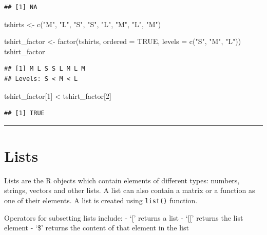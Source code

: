 \documentclass[
]{book}
\newenvironment{Shaded}{\begin{snugshade}}{\end{snugshade}}
\newcommand{\AttributeTok}[1]{\textcolor[rgb]{0.77,0.63,0.00}{#1}}
\newcommand{\ConstantTok}[1]{\textcolor[rgb]{0.00,0.00,0.00}{#1}}
\newcommand{\DecValTok}[1]{\textcolor[rgb]{0.00,0.00,0.81}{#1}}
\newcommand{\FunctionTok}[1]{\textcolor[rgb]{0.00,0.00,0.00}{#1}}
\newcommand{\NormalTok}[1]{#1}
\newcommand{\OtherTok}[1]{\textcolor[rgb]{0.56,0.35,0.01}{#1}}
\newcommand{\SpecialCharTok}[1]{\textcolor[rgb]{0.00,0.00,0.00}{#1}}
\newcommand{\StringTok}[1]{\textcolor[rgb]{0.31,0.60,0.02}{#1}}
\begin{document}
\begin{verbatim}
## [1] NA
\end{verbatim}

\begin{Shaded}
\begin{Highlighting}[]
\NormalTok{tshirts }\OtherTok{\textless{}{-}} \FunctionTok{c}\NormalTok{(}\StringTok{"M"}\NormalTok{, }\StringTok{"L"}\NormalTok{, }\StringTok{"S"}\NormalTok{, }\StringTok{"S"}\NormalTok{, }\StringTok{"L"}\NormalTok{, }\StringTok{"M"}\NormalTok{, }\StringTok{"L"}\NormalTok{, }\StringTok{"M"}\NormalTok{)}

\NormalTok{tshirt\_factor }\OtherTok{\textless{}{-}} \FunctionTok{factor}\NormalTok{(tshirts, }\AttributeTok{ordered =} \ConstantTok{TRUE}\NormalTok{,}
                        \AttributeTok{levels =} \FunctionTok{c}\NormalTok{(}\StringTok{"S"}\NormalTok{, }\StringTok{"M"}\NormalTok{, }\StringTok{"L"}\NormalTok{))}
\NormalTok{tshirt\_factor}
\end{Highlighting}
\end{Shaded}

\begin{verbatim}
## [1] M L S S L M L M
## Levels: S < M < L
\end{verbatim}

\begin{Shaded}
\begin{Highlighting}[]
\NormalTok{tshirt\_factor[}\DecValTok{1}\NormalTok{] }\SpecialCharTok{\textless{}}\NormalTok{ tshirt\_factor[}\DecValTok{2}\NormalTok{]}
\end{Highlighting}
\end{Shaded}

\begin{verbatim}
## [1] TRUE
\end{verbatim}

\begin{center}\rule{0.5\linewidth}{0.5pt}\end{center}

\hypertarget{lists}{%
\section{Lists}\label{lists}}

Lists are the R objects which contain elements of different types: numbers, strings, vectors and other lists. A list can also contain a matrix or a function as one of their elements.
A list is created using \texttt{list()} function.

Operators for subsetting lists include:
- `{[}' returns a list
- `{[}{[}' returns the list element
- `\$' returns the content of that element in the list
\end{document}
